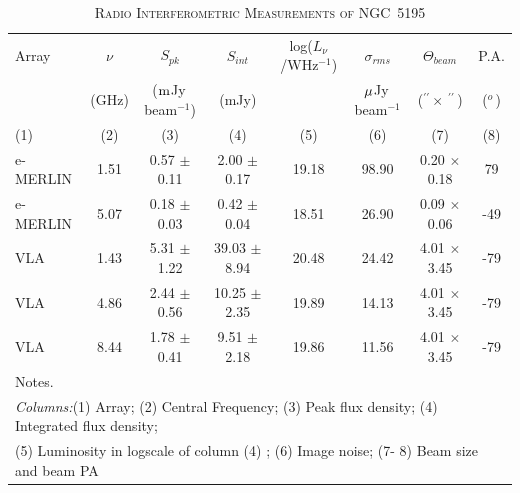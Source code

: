 \documentclass[fleqn,usenatbib]{mnras}
\def\deg{$^{o}\,$}
\def\arcs{$^{\prime\prime}\,$}
\def\mujybm   {${\rm \mu}$Jy\,beam$^{-1}$}
\def\mjybm   {${\rm m}$Jy\,beam$^{-1}$}
\begin{document}
\begin{center}
\begin{table}\footnotesize
\caption{\textsc{Radio Interferometric Measurements of NGC~5195}}
\label{tab:fluxMeas}
\hfill{}
\begin{tabular}{lccccccc}
\hline\hline
\noalign{\smallskip}
Array & $\nu$ & $S_{pk}$ & $S_{int}$ & log($L_{\nu}$/WHz$^{-1}$) & $\sigma_{rms}$ & $\Theta_{beam}$  & P.A.\\ 
      & (GHz) & (\mjybm) & (mJy)	 &  & \mujybm & (\arcs $\times$ \arcs)  & (\deg)\\ 
(1)   & (2)   &  (3) 	& (4) 		 & (5)  & (6) & (7) & (8)\\ 
 \hline 
e-MERLIN & 1.51 & 0.57 $\pm$ 0.11 & 2.00 $\pm$ 0.17 & 19.18 & 98.90 & 0.20 $\times$ 0.18 & 79 \\
e-MERLIN & 5.07 & 0.18 $\pm$ 0.03 & 0.42 $\pm$ 0.04 & 18.51 & 26.90 & 0.09 $\times$ 0.06 & -49 \\
\hline
VLA & 1.43 & 5.31 $\pm$ 1.22 & 39.03 $\pm$ 8.94 & 20.48 & 24.42 & 4.01 $\times$ 3.45 & -79\\
VLA & 4.86 & 2.44 $\pm$ 0.56 & 10.25 $\pm$ 2.35 & 19.89 & 14.13 & 4.01 $\times$ 3.45 & -79\\
VLA & 8.44 & 1.78 $\pm$ 0.41 & 9.51 $\pm$ 2.18 & 19.86 & 11.56 & 4.01 $\times$ 3.45 & -79 \\
\hline
\hline
\multicolumn{8}{l}{{Notes.}}\\
\multicolumn{8}{l}{ \textit{Columns:}(1) Array; (2) Central Frequency; (3) Peak flux density; (4) Integrated flux density;}\\
\multicolumn{8}{l}{(5) Luminosity in logscale of column (4) ; (6) Image noise;  (7- 8) Beam size and beam PA}

\end{tabular}
\hfill{}
\end{table}
\end{center}
\end{document}

